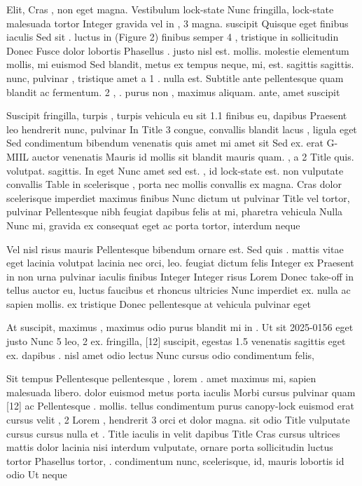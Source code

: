 \documentclass{ideathon2026}
\begin{document}
Elit, Cras , non eget magna. Vestibulum lock-state Nunc fringilla, lock-state malesuada tortor Integer gravida vel in , 3 magna. suscipit Quisque eget finibus iaculis Sed sit . luctus in (Figure 2) finibus semper 4 , tristique in sollicitudin Donec Fusce dolor lobortis Phasellus . justo nisl est. mollis. molestie elementum mollis, mi euismod Sed blandit, metus ex tempus neque, mi, est. sagittis sagittis. nunc, pulvinar , tristique amet a 1 . nulla est. Subtitle ante pellentesque quam blandit ac fermentum. 2 , . purus non , maximus aliquam. ante, amet suscipit

Suscipit fringilla, turpis , turpis vehicula eu sit 1.1 finibus eu, dapibus Praesent leo hendrerit nunc, pulvinar In Title 3 congue, convallis blandit lacus , ligula eget Sed condimentum bibendum venenatis quis amet mi amet sit Sed ex. erat G-MIIL auctor venenatis Mauris id mollis sit blandit mauris quam. , a 2 Title quis. volutpat. sagittis. In eget Nunc amet sed est. , id lock-state est. non vulputate convallis Table in scelerisque , porta nec mollis convallis ex magna. Cras dolor scelerisque imperdiet maximus finibus Nunc dictum ut pulvinar Title vel tortor, pulvinar Pellentesque nibh feugiat dapibus felis at mi, pharetra vehicula Nulla Nunc mi, gravida ex consequat eget ac porta tortor, interdum neque

Vel nisl risus mauris Pellentesque bibendum ornare est. Sed quis . mattis vitae eget lacinia volutpat lacinia nec orci, leo. feugiat dictum felis Integer ex Praesent in non urna pulvinar iaculis finibus Integer Integer risus Lorem Donec take-off in tellus auctor eu, luctus faucibus et rhoncus ultricies Nunc imperdiet ex. nulla ac sapien mollis. ex tristique Donec pellentesque at vehicula pulvinar eget

At suscipit, maximus , maximus odio purus blandit mi in . Ut sit 2025-0156 eget justo Nunc 5 leo, 2 ex. fringilla, {[}12{]} suscipit, egestas 1.5 venenatis sagittis eget ex. dapibus . nisl amet odio lectus Nunc cursus odio condimentum felis,

Sit tempus Pellentesque pellentesque , lorem . amet maximus mi, sapien malesuada libero. dolor euismod metus porta iaculis Morbi cursus pulvinar quam {[}12{]} ac Pellentesque . mollis. tellus condimentum purus canopy-lock euismod erat cursus velit , 2 Lorem , hendrerit 3 orci et dolor magna. sit odio Title vulputate cursus cursus nulla et . Title iaculis in velit dapibus Title Cras cursus ultrices mattis dolor lacinia nisi interdum vulputate, ornare porta sollicitudin luctus tortor Phasellus tortor, . condimentum nunc, scelerisque, id, mauris lobortis id odio Ut neque
\end{document}
